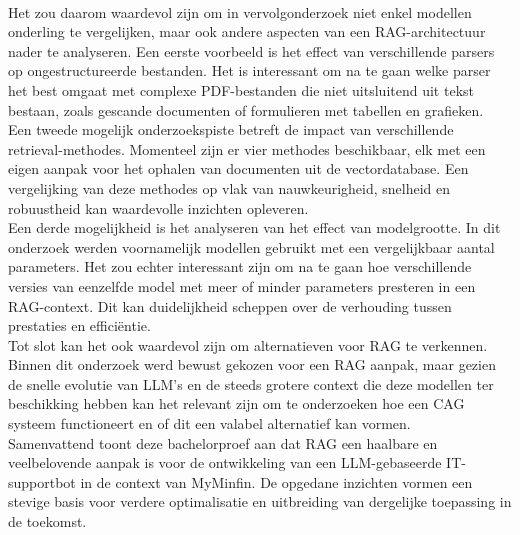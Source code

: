 \\[1em]
Het zou daarom waardevol zijn om in vervolgonderzoek niet enkel modellen onderling te vergelijken, maar ook andere aspecten van een RAG-architectuur nader te analyseren. Een eerste voorbeeld is het effect van verschillende parsers op ongestructureerde bestanden. Het is interessant om na te gaan welke parser het best omgaat met complexe PDF-bestanden die niet uitsluitend uit tekst bestaan, zoals gescande documenten of formulieren met tabellen en grafieken.
\\[1em]
Een tweede mogelijk onderzoekspiste betreft de impact van verschillende retrieval-methodes. Momenteel zijn er vier methodes beschikbaar, elk met een eigen aanpak voor het ophalen van documenten uit de vectordatabase. Een vergelijking van deze methodes op vlak van nauwkeurigheid, snelheid en robuustheid kan waardevolle inzichten opleveren.
\\[1em]
Een derde mogelijkheid is het analyseren van het effect van modelgrootte. In dit onderzoek werden voornamelijk modellen gebruikt met een vergelijkbaar aantal parameters. Het zou echter interessant zijn om na te gaan hoe verschillende versies van eenzelfde model met meer of minder parameters presteren in een RAG-context. Dit kan duidelijkheid scheppen over de verhouding tussen prestaties en efficiëntie.
\\[1em]
Tot slot kan het ook waardevol zijn om alternatieven voor RAG te verkennen. Binnen dit onderzoek werd bewust gekozen voor een RAG aanpak, maar gezien de snelle evolutie van LLM's en de steeds grotere context die deze modellen ter beschikking hebben kan het relevant zijn om te onderzoeken hoe een CAG systeem functioneert en of dit een valabel alternatief kan vormen.
\\[1em]
Samenvattend toont deze bachelorproef aan dat RAG een haalbare en veelbelovende aanpak is voor de ontwikkeling van een LLM-gebaseerde IT-supportbot in de context van MyMinfin. De opgedane inzichten vormen een stevige basis voor verdere optimalisatie en uitbreiding van dergelijke toepassing in de toekomst.